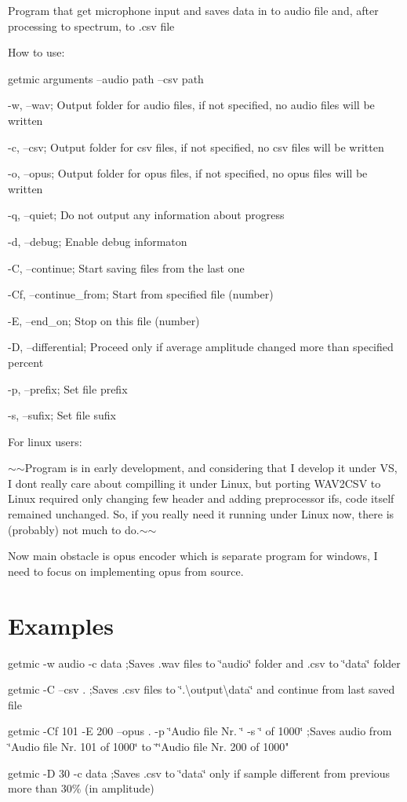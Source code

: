 Program that get microphone input and saves data in to audio file and, after processing to spectrum, to .csv file

How to use\+:

getmic arguments --audio path --csv path

-\/w, --wav; Output folder for audio files, if not specified, no audio files will be written

-\/c, --csv; Output folder for csv files, if not specified, no csv files will be written

-\/o, --opus; Output folder for opus files, if not specified, no opus files will be written

-\/q, --quiet; Do not output any information about progress

-\/d, --debug; Enable debug informaton

-\/C, --continue; Start saving files from the last one

-\/\+Cf, --continue\+\_\+from; Start from specified file (number)

-\/E, --end\+\_\+on; Stop on this file (number)

-\/D, --differential; Proceed only if average amplitude changed more than specified percent

-\/p, --prefix; Set file prefix

-\/s, --sufix; Set file sufix

For linux users\+:

$\sim$$\sim$\+Program is in early development, and considering that I develop it under VS, I don\textquotesingle{}t really care about compilling it under Linux, but porting W\+A\+V2\+C\+SV to Linux required only changing few header and adding preprocessor if\textquotesingle{}s, code itself remained unchanged. So, if you really need it running under Linux now, there is (probably) not much to do.$\sim$$\sim$

Now main obstacle is opus encoder which is separate program for windows, I need to focus on implementing opus from source.

\section*{Examples}

getmic -\/w audio -\/c data ;Saves .wav files to \char`\"{}audio\char`\"{} folder and .csv to \char`\"{}data\char`\"{} folder

getmic -\/C --csv . ;Saves .csv files to \char`\"{}.\textbackslash{}output\textbackslash{}data\char`\"{} and continue from last saved file

getmic -\/\+Cf 101 -\/E 200 --opus . -\/p \char`\"{}\+Audio file Nr. \char`\"{} -\/s \char`\"{} of 1000\char`\"{} ;Saves audio from \char`\"{}\+Audio file Nr. 101 of 1000\char`\"{} to \char`\"{}\char`\"{}Audio file Nr. 200 of 1000"

getmic -\/D 30 -\/c data ;Saves .csv to \char`\"{}data\char`\"{} only if sample different from previous more than 30\% (in amplitude) 